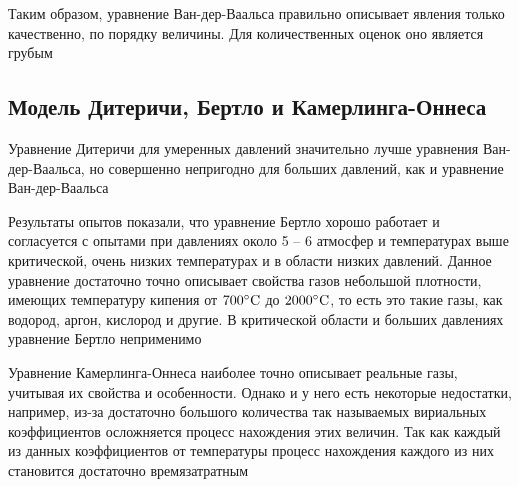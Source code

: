 \documentclass[a4paper, 14pt]{article}
\begin{document}
    Таким образом, уравнение Ван-дер-Ваальса правильно описывает явления только качественно, по порядку величины.
    Для количественных оценок оно является грубым

    \subsection*{Модель Дитеричи, Бертло и Камерлинга-Оннеса} 

    Уравнение Дитеричи для умеренных давлений значительно лучше уравнения Ван-дер-Ваальса, но совершенно непригодно
    для больших давлений, как и уравнение Ван-дер-Ваальса

    Результаты опытов показали, что уравнение Бертло хорошо работает и согласуется с опытами при давлениях около 5 -- 6
    атмосфер и температурах выше критической, очень низких температурах и в области низких давлений.
    Данное уравнение достаточно точно описывает свойства газов небольшой плотности, имеющих температуру кипения от
    $700 \celsius$ до $2000 \celsius$, то есть это такие газы, как водород, аргон, кислород и другие.
    В критической области и больших давлениях уравнение Бертло неприменимо

    Уравнение Камерлинга-Оннеса наиболее точно описывает реальные газы, учитывая их свойства
    и особенности.
    Однако и у него есть некоторые недостатки, например, из-за достаточно большого количества так называемых вириальных
    коэффициентов осложняется процесс нахождения этих величин.
    Так как каждый из данных коэффициентов от температуры процесс нахождения каждого из них становится достаточно
    времязатратным
%
\end{document}
